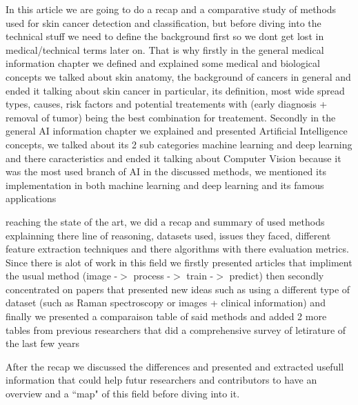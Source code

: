 In this article we are going to do a recap and a comparative study of methods used for skin cancer detection and classification, but before diving into the technical stuff we need to define the background first so we dont get lost in medical/technical terms later on. That is why firstly in the general medical information chapter we defined and explained some medical and biological concepts we talked about skin anatomy, the background of cancers in general and ended it talking about skin cancer in particular, its definition, most wide spread types, causes, risk factors and potential treatements with (early diagnosis + removal of tumor) being the best combination for treatement. Secondly in the general AI information chapter we explained and presented Artificial Intelligence concepts, we talked about its 2 sub categories machine learning and deep learning and there caracteristics and ended it talking about Computer Vision because it was the most used branch of AI in the discussed methods, we mentioned its implementation in both machine learning and deep learning and its famous applications

reaching the state of the art, we did a recap and summary of used methods explainning there line of reasoning, datasets used, issues they faced, different feature extraction techniques and there algorithms with there evaluation metrics. Since there is alot of work in this field we firstly presented articles that impliment the usual method (image -$>$ process -$>$ train -$>$ predict) then secondly concentrated on papers that presented new ideas such as using a different type of dataset (such as Raman spectroscopy or images + clinical information) and finally we presented a comparaison table of said methods and added 2 more tables from previous researchers that did a comprehensive survey of letirature of the last few years

After the recap we discussed the differences and presented and extracted usefull information that could help futur researchers and contributors to have an overview and a ``map" of this field before diving into it. 